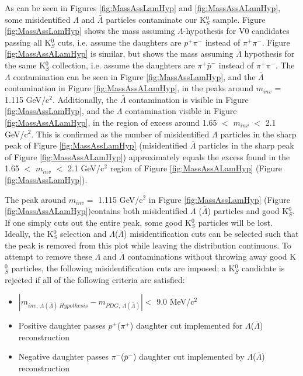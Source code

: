\documentclass[../AnalysisNoteJBuxton.tex]{subfiles}
\begin{document}
As can be seen in Figures \ref{fig:MassAssLamHyp} and \ref{fig:MassAssALamHyp}, some misidentified $\Lambda$ and $\bar{\Lambda}$ particles contaminate our K$^{0}_{S}$ sample.
Figure \ref{fig:MassAssLamHyp} shows the mass assuming $\Lambda$-hypothesis for V0 candidates passing all K$^{0}_{S}$ cuts, i.e. assume the daughters are $p^{+}\pi^{-}$ instead of $\pi^{+}\pi^{-}$.
Figure \ref{fig:MassAssALamHyp} is similar, but shows the mass assuming $\bar{\Lambda}$ hypothesis for the same K$^{0}_{S}$ collection, i.e. assume the daughters are $\pi^{+}\bar{p}^{-}$ instead of $\pi^{+}\pi^{-}$.
The $\Lambda$ contamination can be seen in Figure \ref{fig:MassAssLamHyp}, and the $\bar{\Lambda}$ contamination in Figure \ref{fig:MassAssALamHyp}, in the peaks around $m_{inv}$ = 1.115 GeV/c$^{2}$.
Additionally, the $\bar{\Lambda}$ contamination is visible in Figure \ref{fig:MassAssLamHyp}, and the $\Lambda$ contamination visible in Figure \ref{fig:MassAssALamHyp}, in the region of excess around 1.65 $<$ $m_{inv}$ $<$ 2.1 GeV/c$^{2}$.
This is confirmed as the number of misidentified $\Lambda$ particles in the sharp peak of Figure \ref{fig:MassAssLamHyp} (misidentified $\bar{\Lambda}$ particles in the sharp peak of Figure \ref{fig:MassAssALamHyp}) approximately equals the excess found in the 1.65 $<$ $m_{inv}$ $<$ 2.1 GeV/c$^{2}$ region of Figure \ref{fig:MassAssALamHyp} (Figure \ref{fig:MassAssLamHyp}).

The peak around $m_{inv} = $ 1.115 GeV/c$^{2}$ in Figure \ref{fig:MassAssLamHyp} (Figure \ref{fig:MassAssALamHyp})contains both misidentified $\Lambda$ ($\bar{\Lambda}$) particles and good K$^{0}_{S}$.
If one simply cuts out the entire peak, some good K$^{0}_{S}$ particles will be lost.  Ideally, the K$^{0}_{S}$ selection and $\Lambda$($\bar{\Lambda}$) misidentification cuts can be selected such that the peak is removed from this plot while leaving the distribution continuous.
To attempt to remove these $\Lambda$ and $\bar{\Lambda}$ contaminations without throwing away good K$^{0}_{S}$ particles, the following misidentification cuts are imposed; a K$^{0}_{S}$ candidate is rejected if all of the following criteria are satisfied:
\begin{itemize}
 \item $|m_{inv, \ \Lambda(\bar{\Lambda}) \ Hypothesis} - m_{PDG,\ \Lambda(\bar{\Lambda})}| < $ 9.0 MeV/c$^{2}$
 \item Positive daughter passes $p^{+}$($\pi^{+}$) daughter cut implemented for $\Lambda$($\bar{\Lambda}$) reconstruction
 \item Negative daughter passes $\pi^{-}$($\bar{p}^{-}$) daughter cut implemented by $\Lambda$($\bar{\Lambda}$) reconstruction
\end{itemize} 
\end{document}

